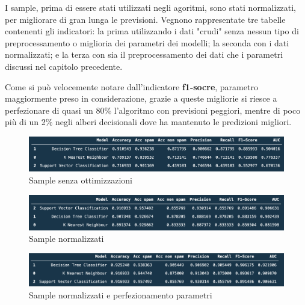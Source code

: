 \documentclass[12pt,a4paper]{article}
\begin{document}
I sample, prima di essere stati utilizzati negli agoritmi, sono stati normalizzati, per migliorare di gran lunga le previsioni. Vegnono rappresentate tre tabelle contenenti gli indicatori: la prima utilizzando i dati "crudi" senza nessun tipo di preprocessamento o miglioria dei parametri dei modelli; la seconda con i dati normalizzati; e la terza con sia il preprocessamento dei dati che i parametri discussi nel capitolo precedente.

Come si può velocemente notare dall'indicatore \textbf{f1-socre}, parametro maggiormente preso in considerazione, grazie a queste migliorie si riesce a perfezionare di quasi un 80\% l'algoritmo con previsioni peggiori, mentre di poco più di un 2\% negli alberi decisionali dove ha mantenuto le predizioni migliori.

\begin{figure}[h]
    \centering
    \includegraphics[width=1\linewidth]{results_nothing.png}
    \caption{Sample senza ottimizzazioni}
\end{figure}

\begin{figure}[h]
    \centering
    \includegraphics[width=1\linewidth]{results_scaler.png}
    \caption{Sample normalizzati}
\end{figure}

\begin{figure}[h]
    \centering
    \includegraphics[width=1\linewidth]{results_optimized_all.png}
    \caption{Sample normalizzati e perfezionamento parametri}
\end{figure}
\end{document}

